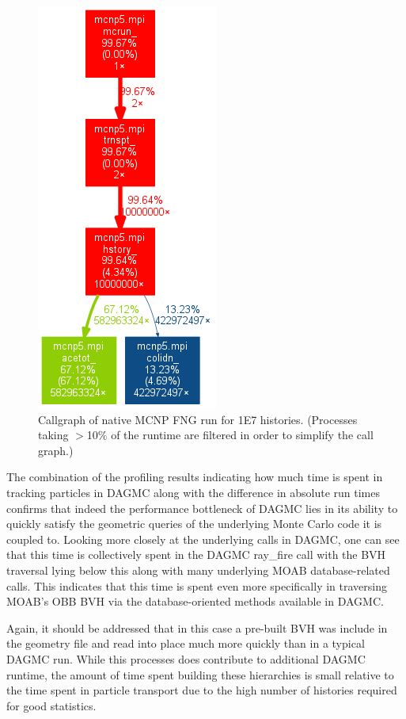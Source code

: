 \documentclass[12pt, a4paper]{article}
\begin{document}
\begin{figure}[H]
  \centering
  \caption{Callgraph of native MCNP FNG run for 1E7 histories. (Processes taking $>$10\% of the runtime are filtered in order to simplify the call graph.)}
  \label{dagmc-fng-coarse}
  \includegraphics[scale=0.35]{mcnp_fng_cg_coarse.png}
\end{figure}

The combination of the profiling results indicating how much time is spent in tracking particles in DAGMC along with the difference in absolute run times confirms that indeed the performance bottleneck of DAGMC lies in its ability to quickly satisfy the geometric queries of the underlying Monte Carlo code it is coupled to. Looking more closely at the underlying calls in DAGMC, one can see that this time is collectively spent in the DAGMC ray\_fire call with the BVH traversal lying below this along with many underlying MOAB database-related calls. This indicates that this time is spent even more specifically in traversing MOAB's OBB BVH via the database-oriented methods available in DAGMC.

Again, it should be addressed that in this case a pre-built BVH was include in the geometry file and read into place much more quickly than in a typical DAGMC run. While this processes does contribute to additional DAGMC runtime, the amount of time spent building these hierarchies is small relative to the time spent in particle transport due to the high number of histories required for good statistics.
\end{document}
